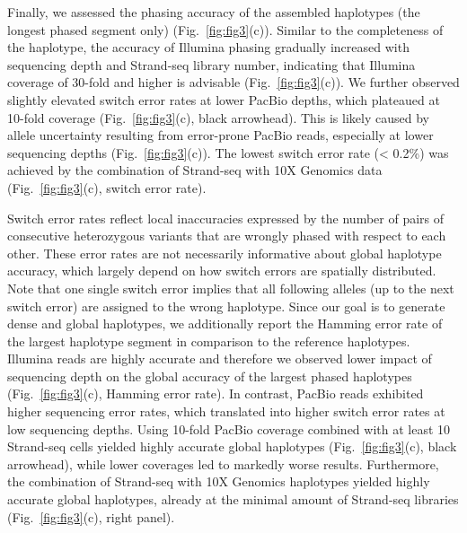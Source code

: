     Finally, we assessed the phasing accuracy of the assembled haplotypes (the longest phased segment only) (Fig.~\ref{fig:fig3}(c)). 
    Similar to the completeness of the haplotype, the accuracy of Illumina phasing gradually increased with sequencing depth and Strand-seq library number, indicating that Illumina coverage of 30-fold and higher is advisable (Fig.~\ref{fig:fig3}(c)). 
    We further observed slightly elevated switch error rates at lower PacBio depths, which plateaued at 10-fold coverage (Fig.~\ref{fig:fig3}(c), black arrowhead). 
    This is likely caused by allele uncertainty resulting from error-prone PacBio reads, especially at lower sequencing depths (Fig.~\ref{fig:fig3}(c)). 
    The lowest switch error rate (< 0.2\%) was achieved by the combination of Strand-seq with 10X Genomics data (Fig.~\ref{fig:fig3}(c), switch error rate).
    
    Switch error rates reflect local inaccuracies expressed by the number of pairs of consecutive heterozygous variants that are wrongly phased with respect to each other. 
    These error rates are not necessarily informative about global haplotype accuracy, which largely depend on how switch errors are spatially distributed. 
    Note that one single switch error implies that all following alleles (up to the next switch error) are assigned to the wrong haplotype. 
    Since our goal is to generate dense and global haplotypes, we additionally report the Hamming error rate of the largest haplotype segment in comparison to the reference haplotypes. 
    Illumina reads are highly accurate and therefore we observed lower impact of sequencing depth on the global accuracy of the largest phased haplotypes (Fig.~\ref{fig:fig3}(c), Hamming error rate). 
    In contrast, PacBio reads exhibited higher sequencing error rates, which translated into higher switch error rates at low sequencing depths. 
    Using 10-fold PacBio coverage combined with at least 10 Strand-seq cells yielded highly accurate global haplotypes (Fig.~\ref{fig:fig3}(c), black arrowhead), 
    while lower coverages led to markedly worse results. Furthermore, the combination of Strand-seq with 10X Genomics haplotypes yielded highly accurate global haplotypes, 
    already at the minimal amount of Strand-seq libraries (Fig.~\ref{fig:fig3}(c), right panel).
    
